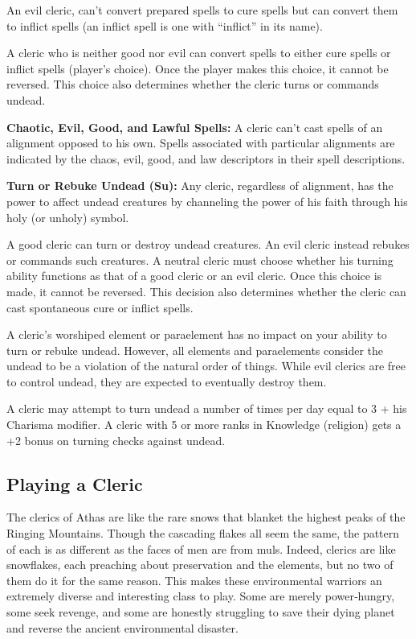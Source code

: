 An evil cleric, can't convert prepared spells to cure spells but can convert them to inflict spells (an inflict spell is one with ``inflict'' in its name).

A cleric who is neither good nor evil can convert spells to either cure spells or inflict spells (player's choice). Once the player makes this choice, it cannot be reversed. This choice also determines whether the cleric turns or commands undead.

\textbf{Chaotic, Evil, Good, and Lawful Spells:} A cleric can't cast spells of an alignment opposed to his own. Spells associated with particular alignments are indicated by the chaos, evil, good, and law descriptors in their spell descriptions.

\textbf{Turn or Rebuke Undead (Su):} Any cleric, regardless of alignment, has the power to affect undead creatures by channeling the power of his faith through his holy (or unholy) symbol.

A good cleric can turn or destroy undead creatures. An evil cleric instead rebukes or commands such creatures. A neutral cleric must choose whether his turning ability functions as that of a good cleric or an evil cleric. Once this choice is made, it cannot be reversed. This decision also determines whether the cleric can cast spontaneous cure or inflict spells.

A cleric's worshiped element or paraelement has no impact on your ability to turn or rebuke undead. However, all elements and paraelements consider the undead to be a violation of the natural order of things. While evil clerics are free to control undead, they are expected to eventually destroy them.

A cleric may attempt to turn undead a number of times per day equal to 3 + his Charisma modifier. A cleric with 5 or more ranks in Knowledge (religion) gets a +2 bonus on turning checks against undead.

\subsection{Playing a Cleric}

The clerics of Athas are like the rare snows that blanket the highest peaks of the Ringing Mountains. Though the cascading flakes all seem the same, the pattern of each is as different as the faces of men are from muls. Indeed, clerics are like snowflakes, each preaching about preservation and the elements, but no two of them do it for the same reason. This makes these environmental warriors an extremely diverse and interesting class to play. Some are merely power‐hungry, some seek revenge, and some are honestly struggling to save their dying planet and reverse the ancient environmental disaster.

